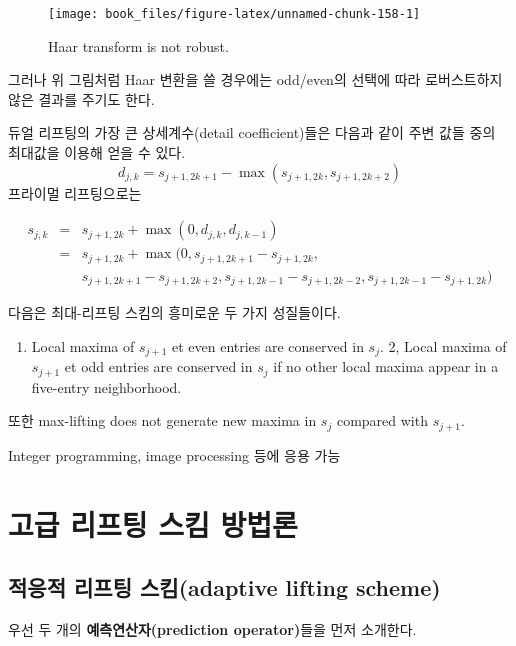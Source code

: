 \documentclass[b5paper,]{scrbook}
\providecommand{\tightlist}{%
  \setlength{\itemsep}{0pt}\setlength{\parskip}{0pt}}
\theoremstyle{plain}
\theoremstyle{definition}
\numberwithin{equation}{section}
\begin{document}
\begin{figure}

{\centering \texttt{[image: book\_files/figure-latex/unnamed-chunk-158-1]} 

}

\caption{Haar transform is not robust.}\label{fig:unnamed-chunk-158}
\end{figure}

그러나 위 그림처럼 Haar 변환을 쓸 경우에는 odd/even의 선택에 따라
로버스트하지 않은 결과를 주기도 한다.

듀얼 리프팅의 가장 큰 상세계수(detail coefficient)들은 다음과 같이 주변
값들 중의 최대값을 이용해 얻을 수 있다.
\[d_{j,k}=s_{j+1,2k+1}-\max(s_{j+1,2k},s_{j+1,2k+2})\] 프라이멀
리프팅으로는

\begin{eqnarray*}
s_{j,k}&=& s_{j+1,2k}+\max (0,d_{j,k},d_{j,k-1})\\
&=&s_{j+1,2k}+\max (0, s_{j+1,2k+1}-s_{j+1,2k}, \\
& &s_{j+1,2k+1}-s_{j+1,2k+2}, s_{j+1,2k-1}-s_{j+1,2k-2}, s_{j+1,2k-1}-s_{j+1,2k})
\end{eqnarray*}

다음은 최대-리프팅 스킴의 흥미로운 두 가지 성질들이다.

\begin{enumerate}
\def\labelenumi{\arabic{enumi}.}
\tightlist
\item
  Local maxima of \(s_{j+1}\) et even entries are conserved in
  \(s_{j}\). 2, Local maxima of \(s_{j+1}\) et odd entries are conserved
  in \(s_{j}\) if no other local maxima appear in a five-entry
  neighborhood.
\end{enumerate}

또한 max-lifting does not generate new maxima in \(s_{j}\) compared with
\(s_{j+1}\).

Integer programming, image processing 등에 응용 가능

\chapter{고급 리프팅 스킴 방법론}\label{advlifting}

\section{적응적 리프팅 스킴(adaptive lifting
scheme)}\label{--adaptive-lifting-scheme}

우선 두 개의 \textbf{예측연산자(prediction operator)}들을 먼저 소개한다.
\end{document}
